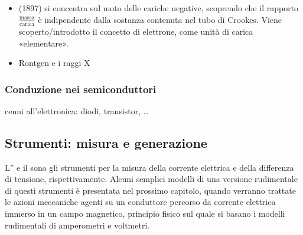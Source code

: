 \documentclass[letterpaper,10pt,italian]{jupyterBook}
\begin{document}
\begin{itemize}
\item {} 
\sphinxAtStartPar
{\hyperref[\detokenize{ch/modern/experiments:modern-experiments-thomson-electron}]{}} (1897) si concentra sul moto delle cariche negative, scoprendo che il rapporto \(\frac{\text{massa}}{\text{carica}}\) è indipendente dalla sostanza contenuta nel tubo di Crookes. Viene scoperto/introdotto il concetto di elettrone, come unità di carica «elementare».

\item {} 
\sphinxAtStartPar
Rontgen e i raggi X  

\end{itemize}


\subsubsection{Conduzione nei semiconduttori}
\label{\detokenize{ch/electromagnetism/electric-current:conduzione-nei-semiconduttori}}\label{\detokenize{ch/electromagnetism/electric-current:physics-hs-electromagnetism-electric-current-semiconductor}}
\sphinxAtStartPar
cenni all’elettronica: diodi, transistor, …


\subsection{Strumenti: misura e generazione}
\label{\detokenize{ch/electromagnetism/electric-current:strumenti-misura-e-generazione}}\label{\detokenize{ch/electromagnetism/electric-current:physics-hs-electromagnetism-electric-current-instruments}}
\sphinxAtStartPar
L”{\hyperref[\detokenize{ch/electromagnetism/electromagnetism-steady:physics-hs-electromagnetism-electromagnetism-steady-experience-faraday-amperometer}]{}} e il {\hyperref[\detokenize{ch/electromagnetism/electromagnetism-steady:physics-hs-electromagnetism-electromagnetism-steady-experience-faraday-voltmeter}]{}} sono gli strumenti per la misura della corrente elettrica e della differenza di tensione, rispettivamente.
Alcuni semplici modelli \sphinxhyphen{} di una versione rudimentale \sphinxhyphen{} di questi strumenti è presentata nel prossimo capitolo, quando verranno trattate le azioni meccaniche agenti su un conduttore percorso da corrente elettrica immerso in un campo magnetico, principio fisico sul quale si basano i modelli rudimentali di amperometri e voltmetri.
\end{document}
